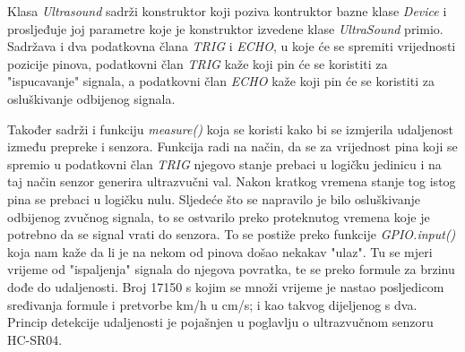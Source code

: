 Klasa \textit{Ultrasound} sadrži konstruktor koji poziva kontruktor bazne klase \textit{Device} i prosljeđuje joj parametre koje je konstruktor izvedene klase \textit{UltraSound} primio. Sadržava i dva podatkovna člana \textit{TRIG} i \textit{ECHO}, u koje će se spremiti vrijednosti pozicije pinova, podatkovni član \textit{TRIG} kaže koji pin će se koristiti za "ispucavanje" signala, a podatkovni član \textit{ECHO} kaže koji pin će se koristiti za osluškivanje odbijenog signala.

Također sadrži i funkciju \textit{measure()} koja se koristi kako bi se izmjerila udaljenost između prepreke i senzora. Funkcija radi na način, da se za vrijednost pina koji se spremio u podatkovni član \textit{TRIG} njegovo stanje prebaci u logičku jedinicu i na taj način senzor generira ultrazvučni val. Nakon kratkog vremena stanje tog istog pina se prebaci u logičku nulu. Sljedeće što se napravilo je bilo osluškivanje odbijenog zvučnog signala, to se ostvarilo preko proteknutog vremena koje je potrebno da se signal vrati do senzora. To se postiže preko funkcije \textit{GPIO.input()} koja nam kaže da li je na nekom od pinova došao nekakav "ulaz". Tu se mjeri vrijeme od "ispaljenja" signala do njegova povratka, te se preko formule za brzinu dođe do udaljenosti. Broj 17150 s kojim se množi vrijeme je nastao posljedicom sređivanja formule i pretvorbe km/h u cm/s; i kao takvog dijeljenog s dva. Princip detekcije udaljenosti je pojašnjen u poglavlju o ultrazvučnom senzoru HC-SR04.
